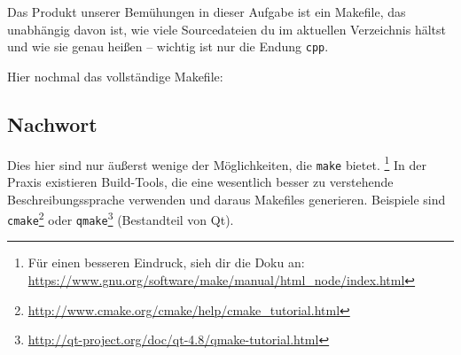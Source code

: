 Das Produkt unserer Bemühungen in dieser Aufgabe ist ein Makefile, das unabhängig davon ist, wie viele Sourcedateien du im aktuellen Verzeichnis hältst und wie sie genau heißen -- wichtig ist nur die Endung \lstinline{cpp}.

Hier nochmal das vollständige Makefile:


\subsection{Nachwort}

Dies hier sind nur äußerst wenige der Möglichkeiten, die \texttt{make} bietet.%
\footnote{Für einen besseren Eindruck, sieh dir die Doku an: \url{https://www.gnu.org/software/make/manual/html_node/index.html}}
%
In der Praxis existieren Build-Tools, die eine wesentlich besser zu verstehende Beschreibungssprache verwenden und daraus Makefiles generieren.
Beispiele sind \texttt{cmake}\footnote{\url{http://www.cmake.org/cmake/help/cmake_tutorial.html}} oder \texttt{qmake}\footnote{\url{http://qt-project.org/doc/qt-4.8/qmake-tutorial.html}} (Bestandteil von Qt).
